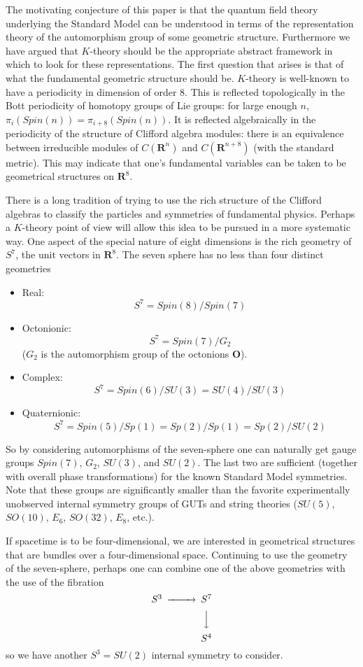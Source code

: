 \documentclass[a4paper,a4paper]{article}
\theoremstyle{conjecture}
\begin{document}
The motivating conjecture of this paper is that the quantum field theory underlying the Standard Model
can be understood in terms of the representation theory of the automorphism group of some geometric
structure. Furthermore we have argued that $K$-theory should be the appropriate abstract framework in
which to look for these representations.  The first question that arises is that of what the fundamental
geometric structure should be.  $K$-theory is well-known to have a periodicity in dimension of order 8.  
This is reflected topologically in the Bott periodicity of homotopy groups of Lie groups: for large
enough $n$, $\pi_i(Spin(n))=\pi_{i+8}(Spin(n))$. It is reflected algebraically in the periodicity of the
structure of Clifford algebra modules: there is an equivalence between irreducible modules of $C(\mathbf
R^n)$ and $C(\mathbf R^{n+8})$ (with the standard metric).  This may indicate that one's fundamental
variables can be taken to be geometrical structures on $\mathbf R^8$.

There is a long tradition of trying to use the rich structure of the Clifford algebras to
classify the particles and symmetries of fundamental physics. Perhaps a $K$-theory point
of view will allow this idea to be pursued in a more systematic way.  One aspect of the
special nature of eight dimensions is the rich geometry of $S^7$, the unit vectors in $\mathbf R^8$.
The seven sphere has no less than four distinct geometries
\begin{itemize}
\item
Real:
$$S^7=Spin(8)/Spin(7)$$
\item
Octonionic:
$$S^7=Spin(7)/G_2$$
($G_2$ is the automorphism group of the octonions $\mathbf O$).
\item
Complex:
$$S^7=Spin(6)/SU(3)=SU(4)/SU(3)$$
\item
Quaternionic:
$$S^7=Spin(5)/Sp(1)=Sp(2)/Sp(1)=Sp(2)/SU(2)$$
\end{itemize}

So by considering automorphisms of the seven-sphere one can naturally get gauge groups
$Spin(7)$, $G_2$, $SU(3)$, and $SU(2)$.  The last two are sufficient (together with overall
phase transformations) for the known Standard Model symmetries. Note that these groups are
significantly smaller than the favorite experimentally unobserved
internal symmetry groups of GUTs and string theories ($SU(5)$, $SO(10)$, $E_6$, $SO(32)$, $E_8$, etc.).

If spacetime is to be four-dimensional, we are interested in geometrical structures that
are bundles over a four-dimensional space.  Continuing to use the geometry of the seven-sphere,
perhaps one can combine one of the above geometries with the use of the fibration
\begin {equation*}
\begin{CD}
S^3 @>>>S^7 \\
@. @VVV\\
{} @. S^4
\end{CD}
\end{equation*}
so we have another $S^3=SU(2)$ internal symmetry to consider.
\end{document}
